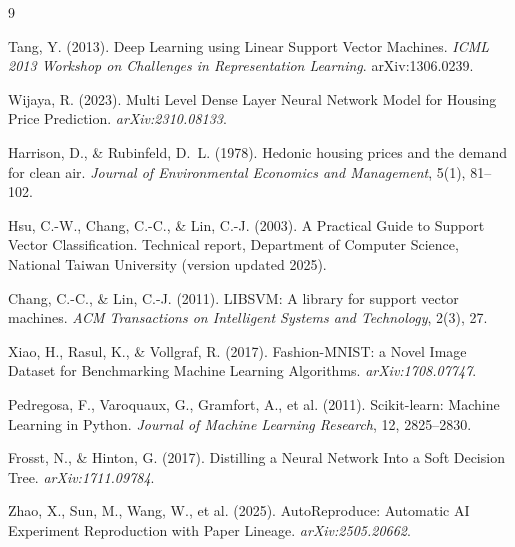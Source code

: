 \documentclass[11pt]{article}
\begin{document}

\begin{thebibliography}{9}

Tang, Y. (2013).
Deep Learning using Linear Support Vector Machines.
\textit{ICML 2013 Workshop on Challenges in Representation Learning}. arXiv:1306.0239.

Wijaya, R. (2023).
Multi Level Dense Layer Neural Network Model for Housing Price Prediction.
\textit{arXiv:2310.08133}.

Harrison, D., \& Rubinfeld, D.~L. (1978).
Hedonic housing prices and the demand for clean air.
\textit{Journal of Environmental Economics and Management}, 5(1), 81--102.

Hsu, C.-W., Chang, C.-C., \& Lin, C.-J. (2003).
A Practical Guide to Support Vector Classification. Technical report, Department of Computer
Science, National Taiwan University (version updated 2025).

Chang, C.-C., \& Lin, C.-J. (2011).
LIBSVM: A library for support vector machines.
\textit{ACM Transactions on Intelligent Systems and Technology}, 2(3), 27.

Xiao, H., Rasul, K., \& Vollgraf, R. (2017).
Fashion-MNIST: a Novel Image Dataset for Benchmarking Machine Learning Algorithms.
\textit{arXiv:1708.07747}.

Pedregosa, F., Varoquaux, G., Gramfort, A., et al. (2011).
Scikit-learn: Machine Learning in Python.
\textit{Journal of Machine Learning Research}, 12, 2825--2830.

Frosst, N., \& Hinton, G. (2017).
Distilling a Neural Network Into a Soft Decision Tree. \textit{arXiv:1711.09784}.

Zhao, X., Sun, M., Wang, W., et al. (2025).
AutoReproduce: Automatic AI Experiment Reproduction with Paper Lineage.
\textit{arXiv:2505.20662}.

\end{thebibliography}
\end{document}
